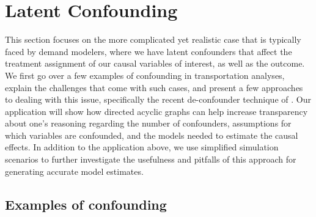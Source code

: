 \section{Latent Confounding}
\label{sec:latent-confounding}

This section focuses on the more complicated yet realistic case that is 
typically faced by demand modelers, where we have latent confounders that 
affect the treatment assignment of our causal variables of interest, as well as the outcome. 
We first go over a few examples of confounding in transportation analyses, explain 
the challenges that come with such cases, and present a few approaches to 
dealing with this issue, specifically the recent de-confounder technique of 
\citet{wang_2019_blessings}. 
Our application will show how directed acyclic graphs can 
help increase transparency about one's reasoning regarding the number of 
confounders, assumptions for which variables are confounded, and the models 
needed to estimate the causal effects. 
In addition to the application above, we use simplified simulation scenarios to further investigate the usefulness 
and pitfalls of this approach for generating accurate model estimates. 


\subsection{Examples of confounding}
\label{sec:confounding-examples}

